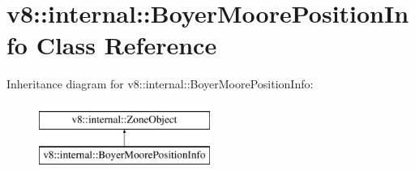 \hypertarget{classv8_1_1internal_1_1BoyerMoorePositionInfo}{}\section{v8\+:\+:internal\+:\+:Boyer\+Moore\+Position\+Info Class Reference}
\label{classv8_1_1internal_1_1BoyerMoorePositionInfo}
Inheritance diagram for v8\+:\+:internal\+:\+:Boyer\+Moore\+Position\+Info\+:\begin{figure}[H]
\begin{center}
\leavevmode
\includegraphics[height=2.000000cm]{classv8_1_1internal_1_1BoyerMoorePositionInfo}
\end{center}
\end{figure}
